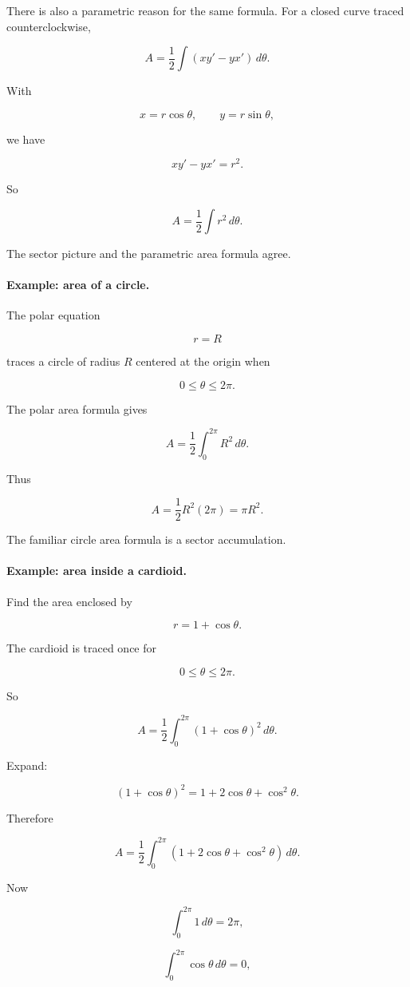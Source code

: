 There is also a parametric reason for the same formula.  For a closed curve traced
counterclockwise,

\[
A=\frac12\int (x y'-y x')\,d\theta.
\]

With

\[
x=r\cos\theta,
\qquad
y=r\sin\theta,
\]

we have

\[
x y'-y x'=r^2.
\]

So

\[
A=\frac12\int r^2\,d\theta.
\]

The sector picture and the parametric area formula agree.

\paragraph{Example: area of a circle.}
The polar equation

\[
r=R
\]

traces a circle of radius \(R\) centered at the origin when

\[
0\le\theta\le2\pi.
\]

The polar area formula gives

\[
A=\frac12\int_0^{2\pi}R^2\,d\theta.
\]

Thus

\[
A=\frac12R^2(2\pi)=\boxed{\pi R^2}.
\]

The familiar circle area formula is a sector accumulation.

\paragraph{Example: area inside a cardioid.}
Find the area enclosed by

\[
r=1+\cos\theta.
\]

The cardioid is traced once for

\[
0\le\theta\le2\pi.
\]

So

\[
A=\frac12\int_0^{2\pi}(1+\cos\theta)^2\,d\theta.
\]

Expand:

\[
(1+\cos\theta)^2=1+2\cos\theta+\cos^2\theta.
\]

Therefore

\[
A
=
\frac12\int_0^{2\pi}
\left(1+2\cos\theta+\cos^2\theta\right)\,d\theta.
\]

Now

\[
\int_0^{2\pi}1\,d\theta=2\pi,
\]

\[
\int_0^{2\pi}\cos\theta\,d\theta=0,
\]


